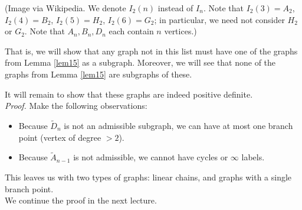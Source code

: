 (Image via Wikipedia. We denote $I_2(n)$ instead of $I_n$. Note that $I_2(3)
= A_2$, $I_2(4) = B_2$, $I_2(5) = H_2$, $I_2(6) = G_2$; in particular, we need
not consider $H_2$ or $G_2$. Note that $A_n, B_n, D_n$ each contain $n$
vertices.)

That is, we will show that any graph not in this list must have one of the
graphs from Lemma \ref{lem15} as a subgraph.
Moreover, we will see that none of the graphs from Lemma \ref{lem15} are
subgraphs of these.

It will remain to show that these
graphs are indeed positive definite.
\\

{\em Proof.}
Make the following observations:

\begin{itemize}
\item
Because $\widetilde{D}_n$ is not an admissible subgraph, we can have at most
one branch point (vertex of degree $>2$).
\item
Because $\widetilde{A}_{n-1}$ is not admissible, we cannot have cycles or
$\infty$ labels.
\end{itemize}

This leaves us with two types of graphs: linear chains, and graphs with
a single branch point.
\\

We continue the proof in the next lecture.
